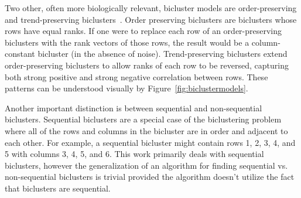 

Two other, often more biologically relevant, bicluster models are order-preserving and trend-preserving biclusters~\cite{wang2016unibic}.
Order preserving biclusters are biclusters whose rows have equal ranks.
If one were to replace each row of an order-preserving biclusters with the rank vectors of those rows, the result would be a column-constant bicluster (in the absence of noise).
Trend-preserving biclusters extend order-preserving biclusters to allow ranks of each row to be reversed, capturing both strong positive and strong negative correlation between rows.
These patterns can be understood visually by Figure~\ref{fig:biclustermodels}.

% 

Another important distinction is between sequential and non-sequential biclusters. Sequential biclusters are a special case of the biclustering problem where all of the rows and columns in the bicluster are in order and adjacent to each other. For example, a sequential bicluster might contain rows 1, 2, 3, 4, and 5 with columns 3, 4, 5, and 6. This work primarily deals with sequential biclusters, however the generalization of an algorithm for finding sequential vs. non-sequential biclusters is trivial provided the algorithm doesn't utilize the fact that biclusters are sequential.

